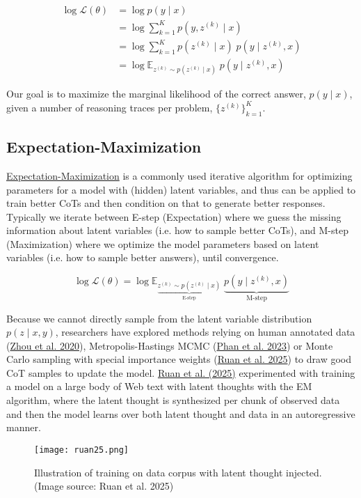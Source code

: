 \documentclass[12pt]{article}
\begin{document}
\begin{align*}
\log \mathcal{L}(\theta)
&= \log p(y \mid x) \\
&= \log \sum_{k=1}^K p(y, z^{(k)} \mid x) \\
&= \log \sum_{k=1}^K p(z^{(k)} \mid x)\; p(y \mid z^{(k)}, x) \\
&= \log \mathbb{E}_{z^{(k)} \sim p(z^{(k)} \mid x)} \; p(y \mid z^{(k)}, x)
\end{align*}

Our goal is to maximize the marginal likelihood of the correct answer, $p(y \mid x)$, given a number of reasoning traces per problem, $\{z^{(k)}\}_{k=1}^K$.

\subsection{Expectation-Maximization}
\href{https://en.wikipedia.org/wiki/Expectation%E2%80%93maximization_algorithm}{Expectation-Maximization} is a commonly used iterative algorithm for optimizing parameters for a model with (hidden) latent variables, and thus can be applied to train better CoTs and then condition on that to generate better responses. Typically we iterate between E-step (Expectation) where we guess the missing information about latent variables (i.e. how to sample better CoTs), and M-step (Maximization) where we optimize the model parameters based on latent variables (i.e. how to sample better answers), until convergence.

\[
\log \mathcal{L}(\theta) =
\log \mathbb{E}_{\underbrace{z^{(k)} \sim p(z^{(k)} \mid x)}_\text{E-step}}\;\underbrace{p(y \mid z^{(k)}, x)}_\text{M-step}
\]

Because we cannot directly sample from the latent variable distribution $p(z \mid x, y)$, researchers have explored methods relying on human annotated data (\href{https://arxiv.org/abs/2011.05268}{Zhou et al. 2020}), Metropolis-Hastings MCMC (\href{https://arxiv.org/abs/2312.02179}{Phan et al. 2023}) or Monte Carlo sampling with special importance weights (\href{https://arxiv.org/abs/2503.18866}{Ruan et al. 2025}) to draw good CoT samples to update the model. \href{https://arxiv.org/abs/2503.18866}{Ruan et al. (2025)} experimented with training a model on a large body of Web text with latent thoughts with the EM algorithm, where the latent thought is synthesized per chunk of observed data and then the model learns over both latent thought and data in an autoregressive manner.

\begin{figure}[h]
    \centering
    \texttt{[image: ruan25.png]}
    \caption{Illustration of training on data corpus with latent thought injected. (Image source: Ruan et al. 2025)}
\end{figure}
\end{document}
